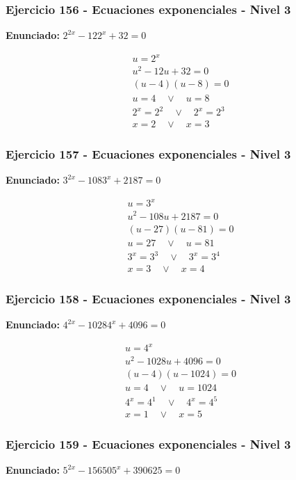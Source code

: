 \documentclass[12pt,a4paper]{article}
\begin{document}
\subsubsection*{Ejercicio 156 - Ecuaciones exponenciales - Nivel 3}
\textbf{Enunciado:} \(2^{2x}-122^x+32=0\)

\[
\begin{aligned}
u=2^x\\
u^2-12u+32=0\\
(u-4)(u-8)=0\\
u=4\quad \vee\quad u=8\\
2^x=2^{2}\quad \vee\quad 2^x=2^{3}\\
\boxed{x=2\quad \vee\quad x=3}
\end{aligned}
\]


\subsubsection*{Ejercicio 157 - Ecuaciones exponenciales - Nivel 3}
\textbf{Enunciado:} \(3^{2x}-1083^x+2187=0\)

\[
\begin{aligned}
u=3^x\\
u^2-108u+2187=0\\
(u-27)(u-81)=0\\
u=27\quad \vee\quad u=81\\
3^x=3^{3}\quad \vee\quad 3^x=3^{4}\\
\boxed{x=3\quad \vee\quad x=4}
\end{aligned}
\]


\subsubsection*{Ejercicio 158 - Ecuaciones exponenciales - Nivel 3}
\textbf{Enunciado:} \(4^{2x}-10284^x+4096=0\)

\[
\begin{aligned}
u=4^x\\
u^2-1028u+4096=0\\
(u-4)(u-1024)=0\\
u=4\quad \vee\quad u=1024\\
4^x=4^{1}\quad \vee\quad 4^x=4^{5}\\
\boxed{x=1\quad \vee\quad x=5}
\end{aligned}
\]


\subsubsection*{Ejercicio 159 - Ecuaciones exponenciales - Nivel 3}
\textbf{Enunciado:} \(5^{2x}-156505^x+390625=0\)
\end{document}

